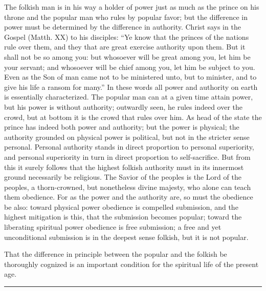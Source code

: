 \documentclass[12pt]{book}
\newcommand{\opage}[1]{\marginnote{\footnotesize\textit{[#1]}}}
\begin{document}
The folkish man is in his way a holder of power just as much as the
prince on his throne and the popular man who rules by popular favor; but
the difference in power must be determined by the difference in
authority. Christ says in the Gospel (Matth. XX) to his disciples: ``Ye
know that the princes of the nations rule over them, and they that are
great exercise authority upon them. But it shall not be so among you:
but whosoever will be great among you, let him be your servant; and
whosoever will be chief among you, let him be subject to you. Even as the
Son of man came not to be ministered unto, but to minister, and to give
his life a ransom for many.'' In these words all power and authority on
earth is essentially characterized. The popular man can at a given time
attain power, but his power is without authority; outwardly seen, he
rules indeed over the crowd, but at bottom it is the crowd
\opage{134}\setcounter{footnote}{0}%
that rules over him. As head of the state the prince has indeed both
power and authority; but the power is physical; the authority grounded
on physical power is political, but not in the stricter sense personal.
Personal authority stands in direct proportion to personal superiority,
and personal superiority in turn in direct proportion to self-sacrifice.
But from this it surely follows that the highest folkish authority must
in its innermost ground necessarily be religious. The Savior of the
peoples is the Lord of the peoples, a thorn-crowned, but nonetheless
divine majesty, who alone can teach them obedience. For as the power
and the authority are, so must the obedience be also: toward physical
power obedience is compelled submission, and the highest mitigation is
this, that the submission becomes popular; toward the liberating
spiritual power obedience is free submission; a free and yet
unconditional submission is in the deepest sense folkish, but it is not
popular.

That the difference in principle between the popular and the folkish be
thoroughly cognized is an important condition for the spiritual life of
the present age.

\begin{center}\rule{3cm}{0.4pt}\end{center}
\end{document}
